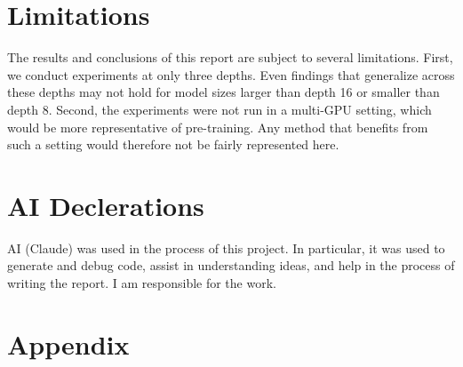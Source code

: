 \documentclass[11pt]{article}
\begin{document}
\section*{Limitations}

The results and conclusions of this report are subject to several limitations. First, we conduct experiments at only three depths. Even findings that generalize across these depths may not hold for model sizes larger than depth 16 or smaller than depth 8. Second, the experiments were not run in a multi-GPU setting, which would be more representative of pre-training. Any method that benefits from such a setting would therefore not be fairly represented here.

\section*{AI Declerations}

AI (Claude) was used in the process of this project. In particular, it was used to generate and debug code, assist in understanding ideas, and help in the process of writing the report. I am responsible for the work.



\clearpage



\clearpage
\onecolumn
\section*{Appendix}




\begin{table}[!htbp]
    \centering
    \footnotesize
    \caption{Final validation bpb as a function of learning rate (column headers) for each variant and depth.}
    \label{tab:val-bpb-vs-lr}
\end{table}
\end{document}
